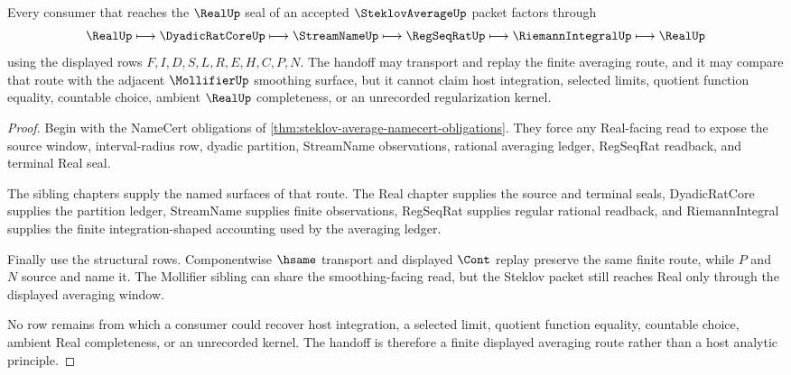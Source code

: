 \begin{theorem}
\label{thm:steklov-average-finite-window-handoff}
Every consumer that reaches the $\RealUp$ seal of an accepted $\SteklovAverageUp$ packet factors through
$$
\RealUp \longmapsto \DyadicRatCoreUp \longmapsto \StreamNameUp \longmapsto \RegSeqRatUp \longmapsto \RiemannIntegralUp \longmapsto \RealUp
$$
using the displayed rows $F,I,D,S,L,R,E,H,C,P,N$. The handoff may transport and replay the finite averaging route, and it may compare that route with the adjacent $\MollifierUp$ smoothing surface, but it cannot claim host integration, selected limits, quotient function equality, countable choice, ambient $\RealUp$ completeness, or an unrecorded regularization kernel.
\end{theorem}
\begin{proof}
Begin with the NameCert obligations of \autoref{thm:steklov-average-namecert-obligations}. They force any Real-facing read to expose the source window, interval-radius row, dyadic partition, StreamName observations, rational averaging ledger, RegSeqRat readback, and terminal Real seal.

The sibling chapters supply the named surfaces of that route. The Real chapter supplies the source and terminal seals, DyadicRatCore supplies the partition ledger, StreamName supplies finite observations, RegSeqRat supplies regular rational readback, and RiemannIntegral supplies the finite integration-shaped accounting used by the averaging ledger.

Finally use the structural rows. Componentwise $\hsame$ transport and displayed $\Cont$ replay preserve the same finite route, while $P$ and $N$ source and name it. The Mollifier sibling can share the smoothing-facing read, but the Steklov packet still reaches Real only through the displayed averaging window.

No row remains from which a consumer could recover host integration, a selected limit, quotient function equality, countable choice, ambient Real completeness, or an unrecorded kernel. The handoff is therefore a finite displayed averaging route rather than a host analytic principle.
\end{proof}


